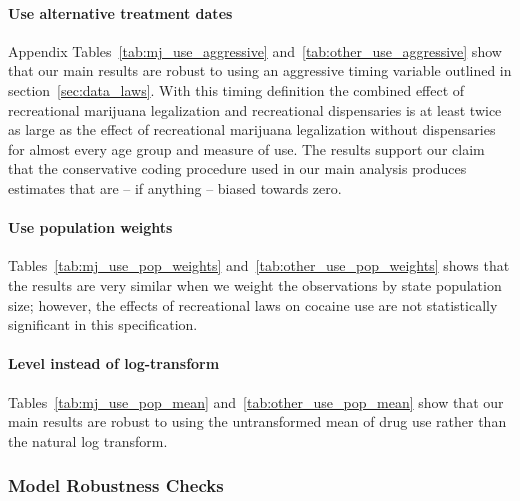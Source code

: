 \documentclass[12pt]{article}%
\begin{document}
\paragraph{Use alternative treatment dates}
Appendix Tables~\ref{tab:mj_use_aggressive} and~\ref{tab:other_use_aggressive} show that our main results are robust to using an aggressive timing variable outlined in section~\ref{sec:data_laws}. With this timing definition the combined effect of recreational marijuana legalization and recreational dispensaries is at least twice as large as the effect of recreational marijuana legalization without dispensaries for almost every age group and measure of use. The results support our claim that the conservative coding procedure used in our main analysis produces estimates that are -- if anything -- biased towards zero.

\paragraph{Use population weights}
Tables~\ref{tab:mj_use_pop_weights} and~\ref{tab:other_use_pop_weights} shows that the results are very similar when we weight the observations by state population size; however, the effects of recreational laws on cocaine use are not statistically significant in this specification.

\paragraph{Level instead of log-transform}
Tables~\ref{tab:mj_use_pop_mean} and~\ref{tab:other_use_pop_mean} show that our main results are robust to using the untransformed mean of drug use rather than the natural log transform.

\subsubsection{Model Robustness Checks}

\end{document}
